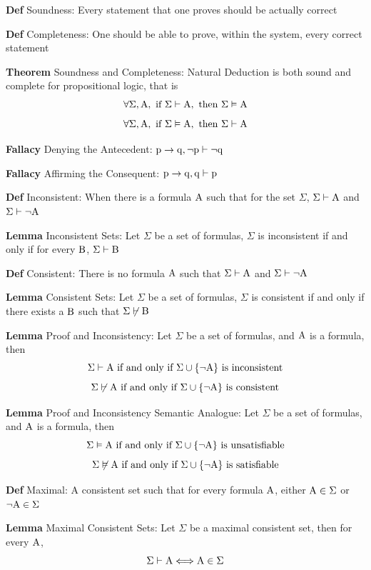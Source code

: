 \documentclass[11pt,notitlepage]{report}
\newcommand{\tbf}[1]{\textbf{#1}}
\begin{document}
\tbf{Def} Soundness: Every statement that one proves should be actually correct

\tbf{Def} Completeness: One should be able to prove, within the system, every correct statement

\tbf{Theorem} Soundness and Completeness: Natural Deduction is both sound and complete for propositional logic, that is
$$\forall \Sigma, \rm A, \text{ if }\Sigma \vdash \rm A, \text{ then }\Sigma \vDash \rm A$$
$$\forall \Sigma, \rm A, \text{ if }\Sigma \vDash \rm A, \text{ then }\Sigma \vdash \rm A$$

\tbf{Fallacy} Denying the Antecedent: $\rm p \to \rm q, \neg \rm p \vdash \neg \rm q$

\tbf{Fallacy} Affirming the Consequent: $\rm p \to \rm q, \rm q \vdash \rm p$

\tbf{Def} Inconsistent: When there is a formula $\rm A$ such that for the set $\Sigma$, $\Sigma \vdash \rm A$ and $\Sigma \vdash \neg \rm A$

\tbf{Lemma} Inconsistent Sets: Let $\Sigma$ be a set of formulas, $\Sigma$ is inconsistent if and only if for every $\rm B$, $\Sigma \vdash \rm B$ 

\tbf{Def} Consistent: There is no formula $\rm A$ such that $\Sigma \vdash \rm A$ and $\Sigma \vdash \neg \rm A$

\tbf{Lemma} Consistent Sets: Let $\Sigma$ be a set of formulas, $\Sigma$ is consistent if and only if there exists a $\rm B$ such that $\Sigma \not \vdash \rm B$ 

\tbf{Lemma} Proof and Inconsistency: Let $\Sigma$ be a set of formulas, and $\rm A$ is a formula, then
$$\Sigma \vdash \rm A \text{ if and only if } \Sigma \cup \{\neg \rm A\} \text{ is inconsistent}$$
$$\Sigma \not \vdash \rm A \text{ if and only if } \Sigma \cup \{\neg \rm A\} \text{ is consistent}$$

\tbf{Lemma} Proof and Inconsistency Semantic Analogue: Let $\Sigma$ be a set of formulas, and $\rm A$ is a formula, then
$$\Sigma \vDash \rm A \text{ if and only if } \Sigma \cup \{\neg \rm A\} \text{ is unsatisfiable}$$
$$\Sigma \not \vDash \rm A \text{ if and only if } \Sigma \cup \{\neg \rm A\} \text{ is satisfiable}$$

\tbf{Def} Maximal: A consistent set such that for every formula $\rm A$, either $\rm A \in \Sigma$ or $\neg \rm A \in \Sigma$

\tbf{Lemma} Maximal Consistent Sets: Let $\Sigma$ be a maximal consistent set, then for every $\rm A$,
$$\Sigma \vdash \rm A \Longleftrightarrow \rm A \in \Sigma$$
\end{document}
